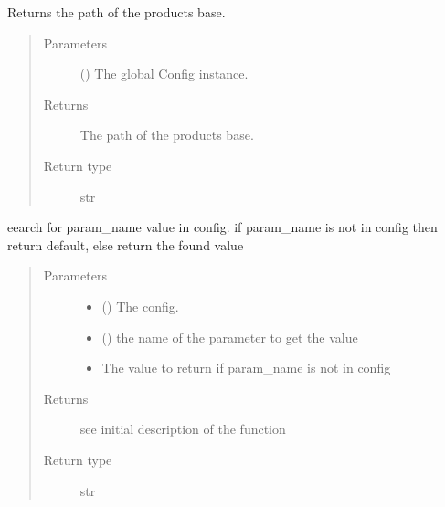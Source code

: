 \documentclass[a4paper,10pt,english]{sphinxmanual}
\begin{document}
\begin{fulllineitems}
\label{\detokenize{commands/apidoc/src:src.__init__.get_base_path}}
Returns the path of the products base.
\begin{quote}\begin{description}
\item[{Parameters}] \leavevmode
{} () \textendash{} The global Config instance.

\item[{Returns}] \leavevmode
The path of the products base.

\item[{Return type}] \leavevmode
str

\end{description}\end{quote}

\end{fulllineitems}


\begin{fulllineitems}
\label{\detokenize{commands/apidoc/src:src.__init__.get_cfg_param}}
eearch for param\_name value in config.
if param\_name is not in config 
then return default,
else return the found value
\begin{quote}\begin{description}
\item[{Parameters}] \leavevmode\begin{itemize}
\item {} 
 () \textendash{} The config.

\item {} 
 () \textendash{} the name of the parameter to get the value

\item {} 
 \textendash{} The value to return if param\_name is not in config

\end{itemize}

\item[{Returns}] \leavevmode
see initial description of the function

\item[{Return type}] \leavevmode
str

\end{description}\end{quote}

\end{fulllineitems}
\end{document}
